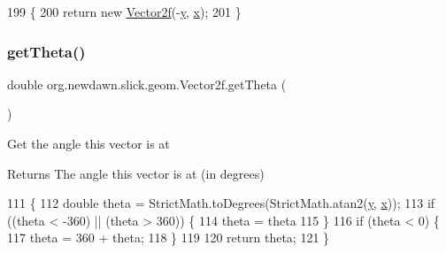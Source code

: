 \begin{DoxyCode}
199                                        \{
200        \textcolor{keywordflow}{return} \textcolor{keyword}{new} \mbox{\hyperlink{classorg_1_1newdawn_1_1slick_1_1geom_1_1_vector2f_a3b8e9eda9c9203462324bf4bc8e42153}{Vector2f}}(-\mbox{\hyperlink{classorg_1_1newdawn_1_1slick_1_1geom_1_1_vector2f_aa03914f0c3d32063aa90e5bd7b74688e}{y}}, \mbox{\hyperlink{classorg_1_1newdawn_1_1slick_1_1geom_1_1_vector2f_a3c72cdf13ebc511a472e1a02002fa579}{x}});
201     \}
\end{DoxyCode}
\mbox{\label{classorg_1_1newdawn_1_1slick_1_1geom_1_1_vector2f_a84195f4ba1d982a324cf8ce49f981d6d}} 
\subsubsection{\texorpdfstring{get\+Theta()}{getTheta()}}
{\footnotesize\ttfamily double org.\+newdawn.\+slick.\+geom.\+Vector2f.\+get\+Theta (\begin{DoxyParamCaption}{ }\end{DoxyParamCaption})\hspace{0.3cm}{\ttfamily [inline]}}

Get the angle this vector is at

\begin{DoxyReturn}{Returns}
The angle this vector is at (in degrees) 
\end{DoxyReturn}

\begin{DoxyCode}
111                              \{
112         \textcolor{keywordtype}{double} theta = StrictMath.toDegrees(StrictMath.atan2(\mbox{\hyperlink{classorg_1_1newdawn_1_1slick_1_1geom_1_1_vector2f_aa03914f0c3d32063aa90e5bd7b74688e}{y}}, \mbox{\hyperlink{classorg_1_1newdawn_1_1slick_1_1geom_1_1_vector2f_a3c72cdf13ebc511a472e1a02002fa579}{x}}));
113         \textcolor{keywordflow}{if} ((theta < -360) || (theta > 360)) \{
114             theta = theta %
115         \}
116         \textcolor{keywordflow}{if} (theta < 0) \{
117             theta = 360 + theta;
118         \}
119 
120         \textcolor{keywordflow}{return} theta;
121     \} 
\end{DoxyCode}
\mbox{\label{classorg_1_1newdawn_1_1slick_1_1geom_1_1_vector2f_ad706bc5b80f139236e643a274947262b}} 
